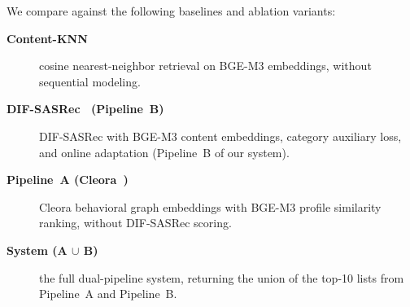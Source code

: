 We compare against the following baselines and ablation variants:
\begin{description}
  \item[\textbf{Content-KNN}] cosine nearest-neighbor retrieval on BGE-M3
        embeddings, without sequential modeling.
  \item[\textbf{DIF-SASRec~\cite{xie2022difsr} (Pipeline~B)}] DIF-SASRec with
        BGE-M3 content embeddings, category auxiliary loss, and online
        adaptation (Pipeline~B of our system).
  \item[\textbf{Pipeline~A (Cleora~\cite{cleora2021})}] Cleora behavioral graph
        embeddings with BGE-M3 profile similarity ranking, without DIF-SASRec
        scoring.
  \item[\textbf{System (A $\cup$ B)}] the full dual-pipeline system, returning
        the union of the top-10 lists from Pipeline~A and Pipeline~B.
\end{description}
